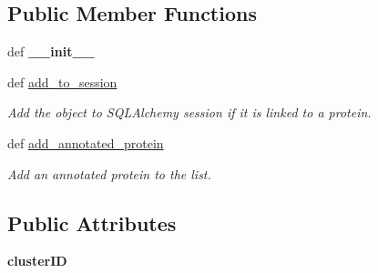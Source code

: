 \subsection*{Public Member Functions}
\begin{DoxyCompactItemize}
\item 
\hypertarget{classsrc_1_1fr_1_1tagc_1_1rainet_1_1core_1_1data_1_1CustomCluster_1_1CustomCluster_adaa4bd6ef404a16b8deb4074bd214329}{def {\bfseries \-\_\-\-\_\-init\-\_\-\-\_\-}}\label{classsrc_1_1fr_1_1tagc_1_1rainet_1_1core_1_1data_1_1CustomCluster_1_1CustomCluster_adaa4bd6ef404a16b8deb4074bd214329}

\item 
\hypertarget{classsrc_1_1fr_1_1tagc_1_1rainet_1_1core_1_1data_1_1CustomCluster_1_1CustomCluster_a8b984de9fd4ea435c23a3016a6a34e48}{def \hyperlink{classsrc_1_1fr_1_1tagc_1_1rainet_1_1core_1_1data_1_1CustomCluster_1_1CustomCluster_a8b984de9fd4ea435c23a3016a6a34e48}{add\-\_\-to\-\_\-session}}\label{classsrc_1_1fr_1_1tagc_1_1rainet_1_1core_1_1data_1_1CustomCluster_1_1CustomCluster_a8b984de9fd4ea435c23a3016a6a34e48}

\begin{DoxyCompactList}\small\item\em Add the object to S\-Q\-L\-Alchemy session if it is linked to a protein. \end{DoxyCompactList}\item 
\hypertarget{classsrc_1_1fr_1_1tagc_1_1rainet_1_1core_1_1data_1_1CustomCluster_1_1CustomCluster_a81acb2f53b6edb6c78b3641f7f1b9fbf}{def \hyperlink{classsrc_1_1fr_1_1tagc_1_1rainet_1_1core_1_1data_1_1CustomCluster_1_1CustomCluster_a81acb2f53b6edb6c78b3641f7f1b9fbf}{add\-\_\-annotated\-\_\-protein}}\label{classsrc_1_1fr_1_1tagc_1_1rainet_1_1core_1_1data_1_1CustomCluster_1_1CustomCluster_a81acb2f53b6edb6c78b3641f7f1b9fbf}

\begin{DoxyCompactList}\small\item\em Add an annotated protein to the list. \end{DoxyCompactList}\end{DoxyCompactItemize}
\subsection*{Public Attributes}
\begin{DoxyCompactItemize}
\item 
\hypertarget{classsrc_1_1fr_1_1tagc_1_1rainet_1_1core_1_1data_1_1CustomCluster_1_1CustomCluster_a327be486227822b7d1a6ec95bfb98757}{{\bfseries cluster\-I\-D}}\label{classsrc_1_1fr_1_1tagc_1_1rainet_1_1core_1_1data_1_1CustomCluster_1_1CustomCluster_a327be486227822b7d1a6ec95bfb98757}

\end{DoxyCompactItemize}
